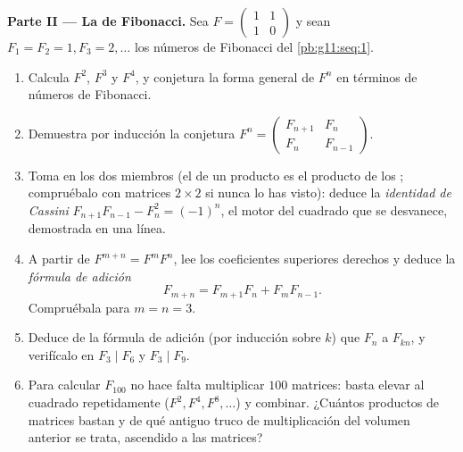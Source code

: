 \begin{problem}
\medskip
\noindent\textbf{Parte II --- La  de Fibonacci.}
Sea $F = \begin{pmatrix} 1 & 1\\ 1 & 0\end{pmatrix}$ y sean
$F_1 = F_2 = 1, F_3 = 2, \dots$ los números de Fibonacci del
\cref{pb:g11:seq:1}.
\begin{enumerate}[resume]
  \item Calcula $F^2$, $F^3$ y $F^4$, y conjetura la forma general de $F^n$
        en términos de números de Fibonacci.
  \item Demuestra por inducción la conjetura
        $F^n = \begin{pmatrix} F_{n+1} & F_n\\ F_n & F_{n-1}
        \end{pmatrix}$.
  \item Toma  en los dos miembros (el  de un
        producto es el producto de los ; compruébalo con
        matrices $2 \times 2$ si nunca lo has visto): deduce la
        \emph{identidad de Cassini}
        $F_{n+1}F_{n-1} - F_n^2 = (-1)^n$, el motor del cuadrado que se
        desvanece, demostrada en una línea.
  \item A partir de $F^{m+n} = F^m F^n$, lee los coeficientes superiores
        derechos y deduce la \emph{fórmula de adición}
        \[
        F_{m+n} = F_{m+1} F_n + F_m F_{n-1} .
        \]
        Compruébala para $m = n = 3$.
  \item Deduce de la fórmula de adición (por inducción sobre $k$) que $F_n$
         a $F_{kn}$, y verifícalo en $F_3 \mid F_6$ y
        $F_3 \mid F_9$.
  \item Para calcular $F_{100}$ no hace falta multiplicar $100$ matrices:
        basta elevar al cuadrado repetidamente ($F^2, F^4, F^8, \dots$) y
        combinar. ¿Cuántos productos de matrices bastan y de qué antiguo
        truco de multiplicación del volumen anterior se trata, ascendido a
        las matrices?
\end{enumerate}


\end{problem}

